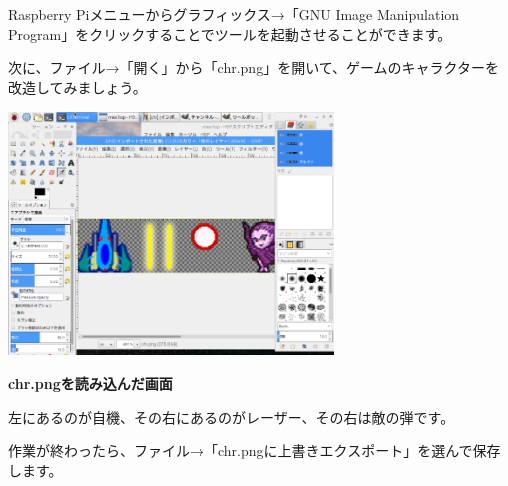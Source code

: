 \documentclass[a4paper,dvipdfmx]{jarticle}
\begin{document}
Raspberry Piメニューからグラフィックス→「GNU Image
Manipulation
Program」をクリックすることでツールを起動させることができます。

次に、ファイル→「開く」から「chr.png」を開いて、ゲームのキャラクターを改造してみましょう。


\bigskip



\begin{center}
\includegraphics[width=8.625cm,height=6.459cm]{text02-img/text02-img042.png}

\end{center}

\bigskip


\bigskip


\bigskip


\bigskip


\bigskip


\bigskip


\bigskip


\bigskip


\bigskip


\bigskip


\bigskip


\bigskip


\bigskip


\bigskip


\bigskip


\bigskip

{\bfseries
chr.pngを読み込んだ画面}


\bigskip


\bigskip

左にあるのが自機、その右にあるのがレーザー、その右は敵の弾です。

作業が終わったら、ファイル→「chr.pngに上書きエクスポート」を選んで保存します。


\bigskip
\end{document}
